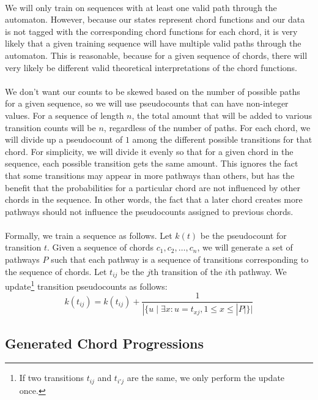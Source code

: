 \documentclass[]{article}
\begin{document}
\paragraph{} We will only train on sequences with at least one valid path through the automaton.  However, because our states represent chord functions and our data is not tagged with the corresponding chord functions for each chord, it is very likely that a given training sequence will have multiple valid paths through the automaton.  This is reasonable, because for a given sequence of chords, there will very likely be different valid theoretical interpretations of the chord functions.

\paragraph{} We don't want our counts to be skewed based on the number of possible paths for a given sequence, so we will use pseudocounts that can have non-integer values.  For a sequence of length $n$, the total amount that will be added to various transition counts will be $n$, regardless of the number of paths.  For each chord, we will divide up a pseudocount of $1$ among the different possible transitions for that chord.  For simplicity, we will divide it evenly so that for a given chord in the sequence, each possible transition gets the same amount.  This ignores the fact that some transitions may appear in more pathways than others, but has the benefit that the probabilities for a particular chord are not influenced by other chords in the sequence.  In other words, the fact that a later chord creates more pathways should not influence the pseudocounts assigned to previous chords.

\paragraph{} Formally, we train a sequence as follows.  Let $k(t)$ be the pseudocount for transition $t$.  Given a sequence of chords $c_1, c_2, \ldots, c_n$, we will generate a set of pathways $P$ such that each pathway is a sequence of transitions corresponding to the sequence of chords.  Let $t_{ij}$ be the $j$th transition of the $i$th pathway.  We update\footnote{If two transitions $t_{ij}$ and $t_{i'j}$ are the same, we only perform the update once.} transition pseudocounts as follows: $$k(t_{ij}) = k(t_{ij}) + \frac{1}{|\{u \mid \exists x : u = t_{xj}, 1 \leq x \leq |P|\}|}$$

\subsection{Generated Chord Progressions}
\end{document}
